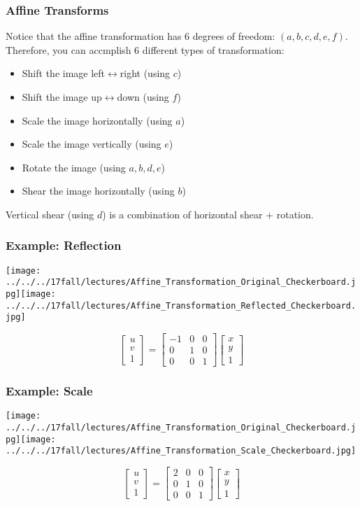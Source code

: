 \documentclass{beamer}
\begin{document}
\begin{frame}
  \frametitle{Affine Transforms}

  Notice that the affine transformation has 6 degrees of freedom:
  $(a,b,c,d,e,f)$.  Therefore, you can accmplish 6 different types of
  transformation:
  \begin{itemize}
  \item Shift the image left$\leftrightarrow$right (using $c$)
  \item Shift the image up$\leftrightarrow$down (using $f$)
  \item Scale the image horizontally (using $a$)
  \item Scale the image vertically (using $e$)
  \item Rotate the image (using $a,b,d,e$)
  \item Shear the image horizontally (using $b$)
  \end{itemize}
  Vertical shear (using $d$) is a combination of horizontal shear + rotation.
\end{frame}

\begin{frame}
  \frametitle{Example: Reflection}
  \centerline{\texttt{[image: ../../../17fall/lectures/Affine\_Transformation\_Original\_Checkerboard.jpg]}\texttt{[image: ../../../17fall/lectures/Affine\_Transformation\_Reflected\_Checkerboard.jpg]}}
  \[
  \left[\begin{array}{c} u\\v\\1\end{array}\right]=
  \left[\begin{array}{ccc}-1&0&0\\0&1&0\\0&0&1\end{array}\right]
  \left[\begin{array}{c}x\\y\\1\end{array}\right]
  \]
\end{frame}

\begin{frame}
  \frametitle{Example: Scale}
  \centerline{\texttt{[image: ../../../17fall/lectures/Affine\_Transformation\_Original\_Checkerboard.jpg]}\texttt{[image: ../../../17fall/lectures/Affine\_Transformation\_Scale\_Checkerboard.jpg]}}
  \[
  \left[\begin{array}{c} u\\v\\1\end{array}\right]=
  \left[\begin{array}{ccc}2&0&0\\0&1&0\\0&0&1\end{array}\right]
  \left[\begin{array}{c}x\\y\\1\end{array}\right]
  \]
\end{frame}
\end{document}
